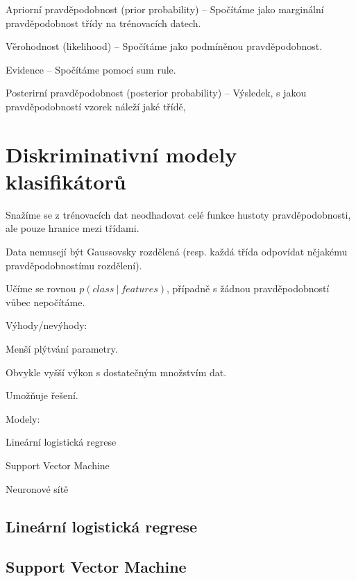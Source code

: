 \begin{compactitem}
    \begin{compactitem}
        \item Apriorní pravděpodobnost (prior probability) -- Spočítáme jako marginální pravděpodobnost třídy na trénovacích datech.

        \item Věrohodnost (likelihood) -- Spočítáme jako podmíněnou pravděpodobnost.

        \item Evidence -- Spočítáme pomocí sum rule.

        \item Posterirní pravděpodobnost (posterior probability) -- Výsledek, s jakou pravděpodobností vzorek náleží jaké třídě,
    \end{compactitem}

\end{compactitem}


\section{Diskriminativní modely klasifikátorů}

\begin{compactitem}
    \item Snažíme se z trénovacích dat neodhadovat celé funkce hustoty pravděpodobnosti, ale pouze hranice mezi třídami.

    \item Data nemusejí být Gaussovsky rozdělená (resp. každá třída odpovídat nějakému pravděpodobnostímu rozdělení).

    \item Učíme se rovnou $p(class ~|~ features)$, případně s žádnou pravděpodobností vůbec nepočítáme.

    \item Výhody/nevýhody: \begin{compactitem}
        \item Menší plýtvání parametry.
        \item Obvykle vyšší výkon s dostatečným množstvím dat.
        \item Umožňuje  řešení.
    \end{compactitem}

    \item Modely: \begin{compactitem}
        \item Lineární logistická regrese
        \item Support Vector Machine
        \item Neuronové sítě
    \end{compactitem}
\end{compactitem}

\subsection{Lineární logistická regrese}


\subsection{Support Vector Machine}

